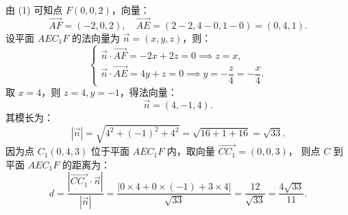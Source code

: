 \begin{answer}
由 (1) 可知点 $F(0, 0, 2)$，向量：
\nopagebreak[4]
\[
\vec{AF} = (-2, 0, 2), \quad \vec{AE} = (2 - 2, 4 - 0, 1 - 0) = (0, 4, 1).
\]
设平面 $AEC_1F$ 的法向量为 $\vec{n} = (x, y, z)$，则：
\nopagebreak[4]
\[
\begin{cases}
\vec{n} \cdot \vec{AF} = -2x + 2z = 0 \implies z = x, \\
\vec{n} \cdot \vec{AE} = 4y + z = 0 \implies y = -\dfrac{z}{4} = -\dfrac{x}{4}.
\end{cases}
\]
取 $x = 4$，则 $z = 4, y = -1$，得法向量：
\nopagebreak[4]
\[
\vec{n} = (4, -1, 4).
\]
其模长为：
\nopagebreak[4]
\[
|\vec{n}| = \sqrt{4^2 + (-1)^2 + 4^2} = \sqrt{16 + 1 + 16} = \sqrt{33}.
\]
因为点 $C_1(0, 4, 3)$ 位于平面 $AEC_1F$ 内，取向量 $\vec{CC_1} = (0, 0, 3)$，
则点 $C$ 到平面 $AEC_1F$ 的距离为：
\nopagebreak[4]
\[
d = \frac{|\vec{CC_1} \cdot \vec{n}|}{|\vec{n}|} = \frac{|0 \times 4 + 0 \times (-1) + 3 \times 4|}{\sqrt{33}} = \frac{12}{\sqrt{33}} = \frac{4\sqrt{33}}{11}.
\]



\end{answer}
